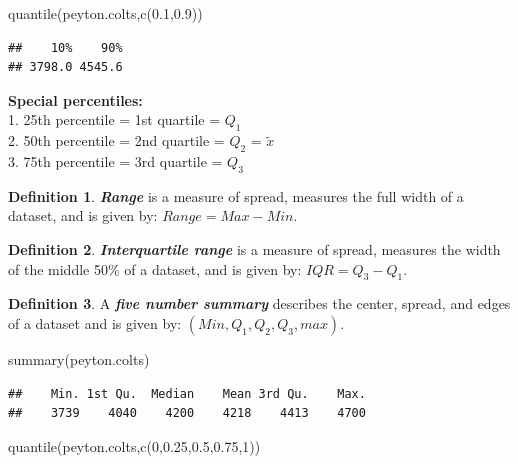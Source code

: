 \documentclass[
  11pt,
]{book}
\newenvironment{Shaded}{\begin{snugshade}}{\end{snugshade}}
\newcommand{\DecValTok}[1]{\textcolor[rgb]{0.00,0.00,0.81}{#1}}
\newcommand{\FloatTok}[1]{\textcolor[rgb]{0.00,0.00,0.81}{#1}}
\newcommand{\FunctionTok}[1]{\textcolor[rgb]{0.00,0.00,0.00}{#1}}
\newcommand{\NormalTok}[1]{#1}
\theoremstyle{definition}
\newtheorem{definition}{Definition}[chapter]
\theoremstyle{definition}
\theoremstyle{definition}
\theoremstyle{definition}
\theoremstyle{remark}
\begin{document}
\begin{Shaded}
\begin{Highlighting}[]
\FunctionTok{quantile}\NormalTok{(peyton.colts,}\FunctionTok{c}\NormalTok{(}\FloatTok{0.1}\NormalTok{,}\FloatTok{0.9}\NormalTok{))}
\end{Highlighting}
\end{Shaded}

\begin{verbatim}
##    10%    90% 
## 3798.0 4545.6
\end{verbatim}

\textbf{Special percentiles:}\\
1. 25th percentile = 1st quartile = \(Q_1\)\\
2. 50th percentile = 2nd quartile = \(Q_2\) = \(\tilde{x}\)\\
3. 75th percentile = 3rd quartile = \(Q_3\)\\

\begin{definition}
\textbf{\emph{Range}} is a measure of spread, measures the full width of a dataset, and is given by: \(Range = Max - Min\).
\end{definition}

\begin{definition}
\textbf{\emph{Interquartile range}} is a measure of spread, measures the width of the middle 50\% of a dataset, and is given by: \(IQR = Q_3 - Q_1\).
\end{definition}

\begin{definition}
A \textbf{\emph{five number summary}} describes the center, spread, and edges of a dataset and is given by: \((Min,Q_1,Q_2,Q_3,max)\).
\end{definition}

\begin{Shaded}
\begin{Highlighting}[]
\FunctionTok{summary}\NormalTok{(peyton.colts)}
\end{Highlighting}
\end{Shaded}

\begin{verbatim}
##    Min. 1st Qu.  Median    Mean 3rd Qu.    Max. 
##    3739    4040    4200    4218    4413    4700
\end{verbatim}

\begin{Shaded}
\begin{Highlighting}[]
\FunctionTok{quantile}\NormalTok{(peyton.colts,}\FunctionTok{c}\NormalTok{(}\DecValTok{0}\NormalTok{,}\FloatTok{0.25}\NormalTok{,}\FloatTok{0.5}\NormalTok{,}\FloatTok{0.75}\NormalTok{,}\DecValTok{1}\NormalTok{))}
\end{Highlighting}
\end{Shaded}
\end{document}
